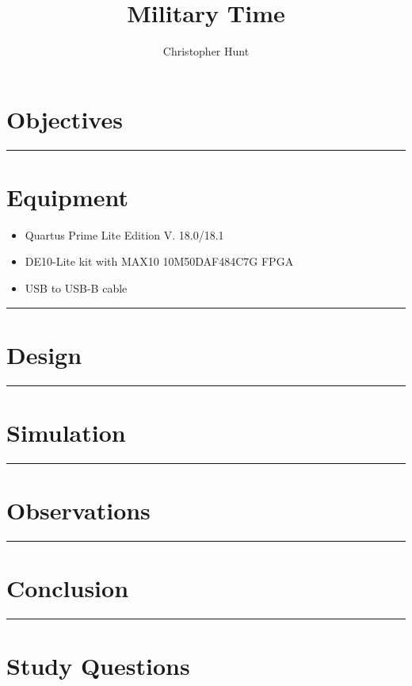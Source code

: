 \documentclass{article}
\title{\textbf{{\huge Military Time}}}
\author{Christopher Hunt}
\date{}
\begin{document}
\pagestyle{fancy}
\fancyhf{}
\rhead{\thepage}
\maketitle
\section*{\textcolor{mycolor}{Objectives}}

\vspace{5mm}
\hrule

\section*{\textcolor{mycolor}{Equipment}}
\begin{itemize}
  \item Quartus Prime Lite Edition V. 18.0/18.1
  \item DE10-Lite kit with MAX10 10M50DAF484C7G FPGA
  \item USB to USB-B cable
\end{itemize}
\vspace{5mm}
\hrule

\section*{\textcolor{mycolor}{Design}}
\vspace{5mm}
\hrule

\section*{\textcolor{mycolor}{Simulation}}

\vspace{5mm}
\hrule

\section*{\textcolor{mycolor}{Observations}}
\vspace{5mm}
\hrule

\section*{\textcolor{mycolor}{Conclusion}}

\vspace{5mm}
\hrule

\section*{\textcolor{mycolor}{Study Questions}}
\end{document}

